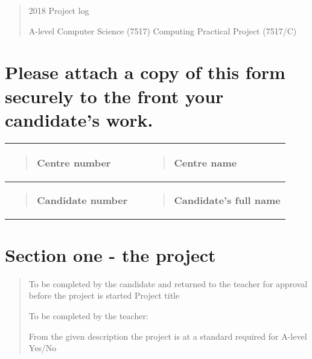 \documentclass[
]{article}
\date{}
\begin{document}
\begin{quote}
2018 Project log

A-level Computer Science (7517) Computing Practical Project (7517/C)
\end{quote}

\hypertarget{please-attach-a-copy-of-this-form-securely-to-the-front-your-candidates-work.}{%
\section{Please attach a copy of this form securely to the front your
candidate's
work.}\label{please-attach-a-copy-of-this-form-securely-to-the-front-your-candidates-work.}}

\begin{longtable}[]{@{}lll@{}}
\toprule
\begin{minipage}[b]{0.30\columnwidth}\raggedright
\begin{quote}
\textbf{Centre number}
\end{quote}

\strut
\end{minipage} & \begin{minipage}[b]{0.30\columnwidth}\raggedright
\strut
\end{minipage} & \begin{minipage}[b]{0.30\columnwidth}\raggedright
\begin{quote}
\textbf{Centre name}


\end{quote}\strut
\end{minipage}\tabularnewline
\midrule
\endhead
\begin{minipage}[t]{0.30\columnwidth}\raggedright
\begin{quote}
\textbf{Candidate number}


\end{quote}\strut
\end{minipage} & \begin{minipage}[t]{0.30\columnwidth}\raggedright
\strut
\end{minipage} & \begin{minipage}[t]{0.30\columnwidth}\raggedright
\begin{quote}
\textbf{Candidate's full name}

\end{quote}\strut
\end{minipage}\tabularnewline
\bottomrule
\end{longtable}

\hypertarget{section-two-project-assessment}{%
\section{Section one - the project}\label{section-one-the-project}}
\begin{quote}
To be completed by the candidate and returned to the teacher for
approval before the project is started Project title 

To be completed by the teacher:

From the given description the project is at a standard required for
A-level Yes/No
\end{quote}
\end{document}
